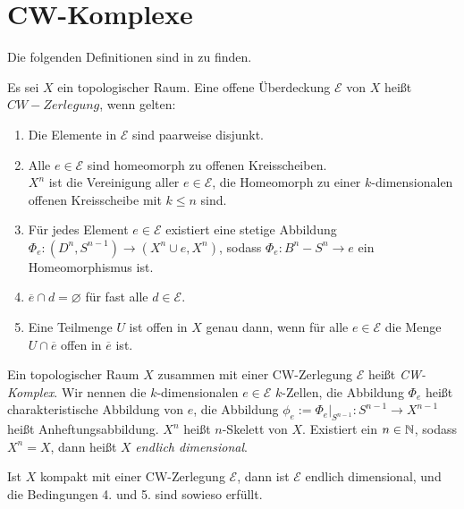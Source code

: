 \section{CW-Komplexe}

Die folgenden Definitionen sind in \cite{dold} zu finden.

\begin{definition}
    \label{def: cw-komplex}
    Es sei $X$ ein topologischer Raum. Eine offene Überdeckung $\mathcal{E}$ von $X$ heißt 
    $CW-Zerlegung$, wenn gelten:
    \begin{enumerate}
        \item Die Elemente in $\mathcal{E}$ sind paarweise disjunkt.
        \item Alle $e \in \mathcal{E}$ sind homeomorph zu offenen Kreisscheiben. \\
            $X^n$ ist die Vereinigung aller $e \in \mathcal{E}$, die Homeomorph zu einer
            $k$-dimensionalen offenen Kreisscheibe mit $k \leq n$ sind.
        \item Für jedes Element $e \in \mathcal{E}$ existiert eine stetige Abbildung
            $\Phi_e \colon (D^n, S^{n - 1}) \to (X^n \cup e, X^n)$, sodass 
            $\Phi_e \colon B^n - S^n \to e$ ein Homeomorphismus ist. 
        \item $\overline{e} \cap d = \varnothing$ für fast alle $d \in \mathcal{E}$.
        \item Eine Teilmenge $U$ ist offen in $X$ genau dann, wenn für alle $e \in \mathcal{E}$ die
            Menge $U \cap \overline{e}$ offen in $\overline{e}$ ist. 
    \end{enumerate}
    
    Ein topologischer Raum $X$ zusammen mit einer CW-Zerlegung $\mathcal{E}$ heißt 
    \textit{CW-Komplex}.
    Wir nennen die $k$-dimensionalen $e \in \mathcal{E}$ $k$-Zellen, die Abbildung $\Phi_e$
    heißt charakteristische Abbildung von $e$, die Abbildung 
    $\phi_e := \Phi_e|_{S^{n - 1}} \colon S^{n - 1} \to X^{n - 1}$ heißt Anheftungsabbildung.
    $X^n$ heißt $n$-Skelett von $X$. Existiert ein $n \in { \mathbb N }$, sodass $X^n = X$, dann heißt
    $X$ \textit{endlich dimensional}.
\end{definition}

\begin{remark}
    Ist $X$ kompakt mit einer CW-Zerlegung $\mathcal{E}$, dann ist $\mathcal{E}$ endlich dimensional, 
    und die Bedingungen 4. und 5. sind sowieso erfüllt.
\end{remark}

